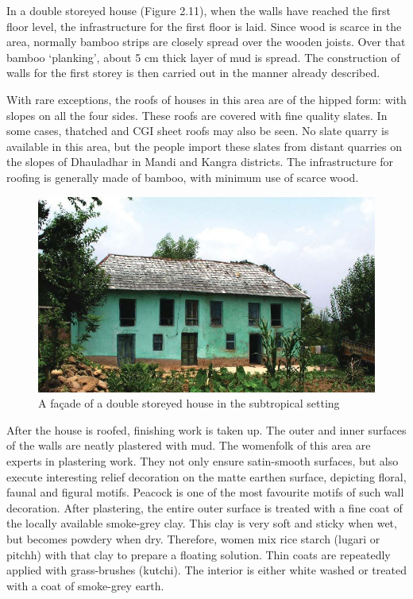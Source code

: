 In a double storeyed house (Figure 2.11), when the walls have reached the first floor level, the infrastructure for the first floor is laid. Since wood is scarce in the area, normally bamboo strips are closely spread over the wooden joists. Over that bamboo ‘planking’, about 5 cm thick layer of mud is spread. The construction of walls for the first storey is then carried out in the manner already described.

With rare exceptions, the roofs of houses in this area are of the hipped form: with slopes on all the four sides. These roofs are covered with fine quality slates. In some cases, thatched and CGI sheet roofs may also be seen. No slate quarry is available in this area, but the people import these slates from distant quarries on the slopes of Dhauladhar in Mandi and Kangra districts. The infrastructure for roofing is generally made of bamboo, with minimum use of scarce wood.

\begin{figure}[!htbp]
\includegraphics[scale=.36]{images/chap02-11.jpg}
\caption{A façade of a double storeyed house in the subtropical setting}\label{chap02-fig11}
\end{figure}

After the house is roofed, finishing work is taken up. The outer and inner surfaces of the walls are neatly plastered with mud. The womenfolk of this area are experts in plastering work. They not only ensure satin-smooth surfaces, but also execute interesting relief decoration on the matte earthen surface, depicting floral, faunal and figural motifs. Peacock is one of the most favourite motifs of such wall decoration. After plastering, the entire outer surface is treated with a fine coat of the locally available smoke-grey clay. This clay is very soft and sticky when wet, but becomes powdery when dry. Therefore, women mix rice starch (lugari or pitchh) with that clay to prepare a floating solution. Thin coats are repeatedly applied with grass-brushes (kutchi). The interior is either white washed or treated with a coat of smoke-grey earth.


